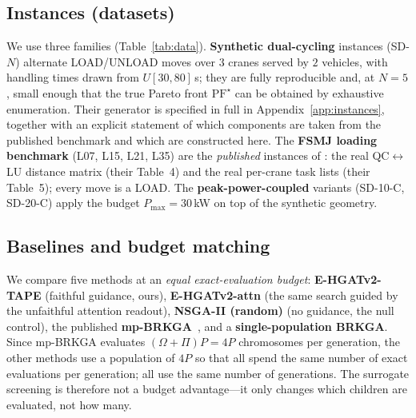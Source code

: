 \documentclass[11pt]{article}
\begin{document}
\subsection{Instances (datasets)}
\label{sec:instances}
We use three families (Table~\ref{tab:data}). \textbf{Synthetic dual-cycling} instances
(\textsf{SD-$N$}) alternate LOAD/\allowbreak UNLOAD moves over $3$ cranes served by $2$ vehicles, with
handling times drawn from $U[30,80]$\,s; they are fully reproducible and, at $N=5$, small
enough that the true Pareto front $\mathrm{PF}^\star$ can be obtained by exhaustive
enumeration. Their generator is specified in full in
Appendix~\ref{app:instances}, together with an explicit statement of which components are
taken from the published benchmark and which are constructed here. The \textbf{FSMJ loading benchmark}
(\textsf{L07}, \textsf{L15}, \textsf{L21}, \textsf{L35}) are the \emph{published} instances of
\cite{homayouni2022book}: the real QC$\leftrightarrow$LU distance matrix (their Table~4) and
the real per-crane task lists (their Table~5); every move is a LOAD. The
\textbf{peak-power-coupled} variants (\textsf{SD-10-C}, \textsf{SD-20-C}) apply the budget
$P_{\max}=30$\,kW on top of the synthetic geometry.

\begin{table}[t]
\centering
\caption{Problem instances. $N$ = number of container moves.}
\label{tab:data}
\small
{}
\end{table}

\subsection{Baselines and budget matching}
We compare five methods at an \emph{equal exact-evaluation budget}:
\textbf{E-HGATv2-TAPE} (faithful guidance, ours), \textbf{E-HGATv2-attn} (the same search
guided by the unfaithful attention readout), \textbf{NSGA-II (random)} (no guidance, the
null control), the published \textbf{mp-BRKGA}~\cite{fontes2022mpbrkga}, and a
\textbf{single-population BRKGA}. Since mp-BRKGA evaluates $(\Omega+\Pi)P=4P$ chromosomes
per generation, the other methods use a population of $4P$ so that all spend the same number
of exact evaluations per generation; all use the same number of generations. The surrogate
screening is therefore not a budget advantage---it only changes which children are
evaluated, not how many.
\end{document}
